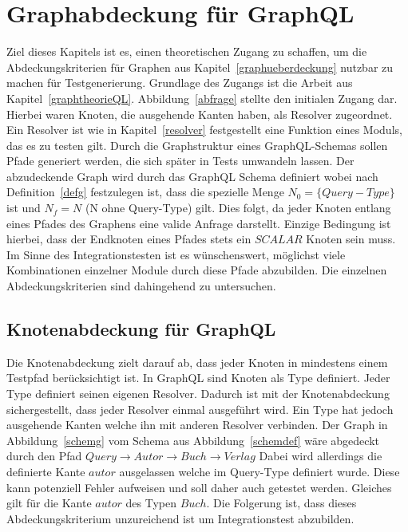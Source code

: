 \chapter{Graphabdeckung für GraphQL}
\label{gqlcov}

Ziel dieses Kapitels ist es, einen theoretischen Zugang zu schaffen, um die Abdeckungskriterien für Graphen aus Kapitel~\ref{graphueberdeckung} nutzbar zu machen für Testgenerierung.
Grundlage des Zugangs ist die Arbeit aus Kapitel~\ref{graphtheorieQL}.
Abbildung~\ref{abfrage} stellte den initialen Zugang dar.
Hierbei waren Knoten, die ausgehende Kanten haben, als Resolver zugeordnet.
Ein Resolver ist wie in Kapitel~\ref{resolver} festgestellt eine Funktion eines Moduls, das es zu testen gilt.
Durch die Graphstruktur eines GraphQL-Schemas sollen Pfade generiert werden, die sich später in Tests umwandeln lassen.
Der abzudeckende Graph wird durch das GraphQL Schema definiert wobei nach Definition~\ref{defg} festzulegen ist,
dass die spezielle Menge $N_{0} = \{ Query-Type \}$ ist und $N_{f} = N$ (N ohne Query-Type) gilt.
Dies folgt, da jeder Knoten entlang eines Pfades des Graphens eine valide Anfrage darstellt.
Einzige Bedingung ist hierbei, dass der Endknoten eines Pfades stets ein $SCALAR$ Knoten sein muss.
Im Sinne des Integrationstesten ist es wünschenswert, möglichst viele Kombinationen einzelner Module durch diese Pfade abzubilden.
Die einzelnen Abdeckungskriterien sind dahingehend zu untersuchen.

\section{Knotenabdeckung für GraphQL}

Die Knotenabdeckung zielt darauf ab, dass jeder Knoten in mindestens einem Testpfad berücksichtigt ist.
In GraphQL sind Knoten als Type definiert.
Jeder Type definiert seinen eigenen Resolver.
Dadurch ist mit der Knotenabdeckung sichergestellt, dass jeder Resolver einmal ausgeführt wird.
Ein Type hat jedoch ausgehende Kanten welche ihn mit anderen Resolver verbinden.
Der Graph in Abbildung~\ref{schemg} vom Schema aus Abbildung~\ref{schemdef} wäre abgedeckt durch den Pfad
$ Query \rightarrow Autor \rightarrow Buch \rightarrow Verlag $
Dabei wird allerdings die definierte Kante $autor$ ausgelassen welche im Query-Type definiert wurde.
Diese kann potenziell Fehler aufweisen und soll daher auch getestet werden.
Gleiches gilt für die Kante $autor$ des Typen $Buch$.
Die Folgerung ist, dass dieses Abdeckungskriterium unzureichend ist um Integrationstest abzubilden.

